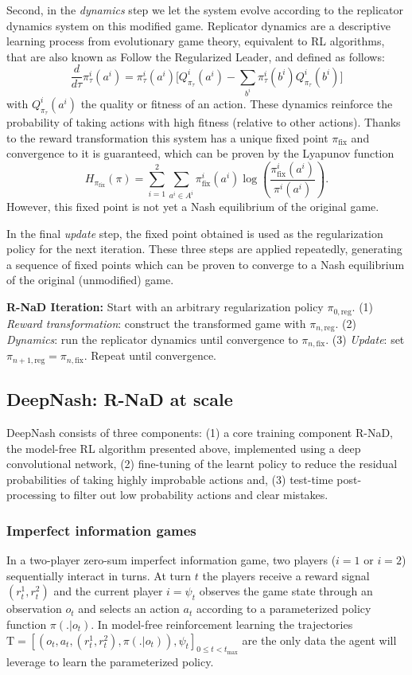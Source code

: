 Second, in the \emph{dynamics} step we let the system evolve according to the replicator dynamics system on this modified game. Replicator dynamics are a descriptive learning process from evolutionary game theory, equivalent to RL algorithms, that are also known as Follow the Regularized Leader, and defined as follows:
$$\frac{d}{d\tau}\pi^i_\tau(a^i) = \pi^i_\tau(a^i)\Big[Q^i_{\pi_\tau}(a^i)-\sum_{b^i}\pi^i_\tau(b^i)Q^i_{\pi_\tau}(b^i)\Big]$$
with $Q^i_{\pi_\tau}(a^i)$ the quality or fitness of an action. These dynamics reinforce the probability of taking actions with high fitness (relative to other actions). Thanks to the reward transformation this system has a unique fixed point $\pi_\textrm{fix}$ and convergence to it is guaranteed, which can be proven by the Lyapunov function
$$H_{\pi_{\textrm{fix}}}(\pi) = \sum_{i=1}^{2} \sum_{a^i \in A^i} \pi^i_{\textrm{fix}}(a^i)\log\!\left(\frac{\pi^i_{\textrm{fix}}(a^i)}{\pi^i(a^i)}\right).$$
However, this fixed point is not yet a Nash equilibrium of the original game.

In the final \emph{update} step, the fixed point obtained is used as the regularization policy for the next iteration. These three steps are applied repeatedly, generating a sequence of fixed points which can be proven to converge to a Nash equilibrium of the original (unmodified) game.

\textbf{R-NaD Iteration:} Start with an arbitrary regularization policy $\pi_{0,\text{reg}}$. (1) \emph{Reward transformation}: construct the transformed game with $\pi_{n,\textrm{reg}}$. (2) \emph{Dynamics}: run the replicator dynamics until convergence to $\pi_{n,\textrm{fix}}$. (3) \emph{Update}: set $\pi_{n+1,\textrm{reg}} = \pi_{n,\textrm{fix}}$. Repeat until convergence.

\subsection{DeepNash: R-NaD at scale}
DeepNash consists of three components: (1) a core training component R-NaD, the model-free RL algorithm presented above, implemented using a deep convolutional network, (2) fine-tuning of the learnt policy to reduce the residual probabilities of taking highly improbable actions and, (3) test-time post-processing to filter out low probability actions and clear mistakes.

\subsubsection{Imperfect information games}
In a two-player zero-sum imperfect information game, two players ($i=1$ or $i=2$) sequentially interact in turns. At turn $t$ the players receive a reward signal $(r^1_t, r^2_t)$ and the current player $i=\psi_t$ observes the game state through an observation $o_t$ and selects an action $a_t$ according to a parameterized policy function $\pi(.|o_t)$. In model-free reinforcement learning the trajectories $\mathrm{T} = [(o_t, a_t, (r^1_t, r^2_t),\pi(.|o_t)), \psi_t]_{0\leq t <t_{\textrm{max}}}$ are the only data the agent will leverage to learn the parameterized policy.

